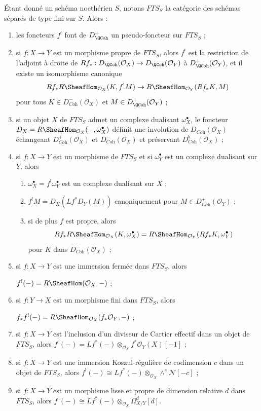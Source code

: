 \medskip\noindent
Étant donné un schéma noethérien $S$, notons $\textit{FTS}_S$ la catégorie des schémas séparés de type fini sur $S$. Alors :
\begin{enumerate}
\item les foncteurs $f^!$ font de $D_\QCoh^+$ un pseudo-foncteur sur $\textit{FTS}_S$ ;
\item si $f : X \to Y$ est un morphisme propre de $\textit{FTS}_S$, alors $f^!$ est la restriction de l'adjoint à droite de $Rf_* : D_\QCoh(\mathcal{O}_X) \to D_\QCoh(\mathcal{O}_Y)$ à $D_\QCoh^+(\mathcal{O}_Y)$, et il existe un isomorphisme canonique
$$
Rf_*R\SheafHom_{\mathcal{O}_X}(K, f^!M)
\to
R\SheafHom_{\mathcal{O}_Y}(Rf_*K, M)
$$
pour tous $K \in D_{\textit{Coh}}^-(\mathcal{O}_X)$ et $M \in D_\QCoh^+(\mathcal{O}_Y)$ ;
\item si un objet $X$ de $\textit{FTS}_S$ admet un complexe dualisant $\omega_X^\bullet$, le foncteur
$D_X = R\SheafHom_{\mathcal{O}_X}(-, \omega_X^\bullet)$
définit une involution de $D_{\textit{Coh}}(\mathcal{O}_X)$ échangeant $D_{\textit{Coh}}^+(\mathcal{O}_X)$ et $D_{\textit{Coh}}^-(\mathcal{O}_X)$ et préservant $D_{\textit{Coh}}^b(\mathcal{O}_X)$ ;
\item si $f : X \to Y$ est un morphisme de $\textit{FTS}_S$ et si $\omega_Y^\bullet$ est un complexe dualisant sur $Y$, alors
\begin{enumerate}
\item $\omega_X^\bullet = f^!\omega_Y^\bullet$ est un complexe dualisant sur $X$ ;
\item $f^!M = D_X(Lf^*D_Y(M))$ canoniquement pour $M \in D_{\textit{Coh}}^+(\mathcal{O}_Y)$ ;
\item si de plus $f$ est propre, alors
$$
Rf_*R\SheafHom_{\mathcal{O}_X}(K, \omega_X^\bullet) =
R\SheafHom_{\mathcal{O}_Y}(Rf_*K, \omega_Y^\bullet)
$$
pour $K$ dans $D^-_{\textit{Coh}}(\mathcal{O}_X)$ ;
\end{enumerate}
\item si $f : X \to Y$ est une immersion fermée dans $\textit{FTS}_S$, alors
\par\noindent\hfil
$f^!(-) = R\SheafHom(\mathcal{O}_X, -)$ ;
\hfil\par
\item si $f : Y \to X$ est un morphisme fini dans $\textit{FTS}_S$, alors
\par\noindent\hfil
$f_*f^!(-) = R\SheafHom_{\mathcal{O}_X}(f_*\mathcal{O}_Y, -)$ ;
\hfil\par
\item si $f : X \to Y$ est l'inclusion d'un diviseur de Cartier effectif dans un objet de $\textit{FTS}_S$, alors $f^!(-) = Lf^*(-) \otimes_{\mathcal{O}_X} f^*\mathcal{O}_Y(X)[-1]$ ;
\item si $f : X \to Y$ est une immersion Koszul-régulière de codimension $c$ dans un objet de $\textit{FTS}_S$, alors $f^!(-) \cong Lf^*(-) \otimes_{\mathcal{O}_X} \wedge^c\mathcal{N}[-c]$ ;
\item si $f : X \to Y$ est un morphisme lisse et propre de dimension relative $d$ dans $\textit{FTS}_S$, alors $f^!(-) \cong Lf^*(-)  \otimes_{\mathcal{O}_X} \Omega^d_{X/Y}[d]$.
\end{enumerate}
